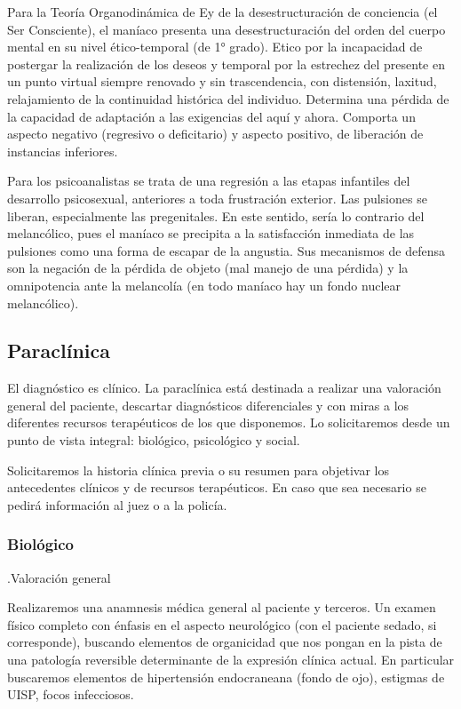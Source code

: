\documentclass{scrbook}
\begin{document}
Para la Teoría Organodinámica de Ey de la desestructuración de conciencia (el Ser Consciente), el maníaco presenta una desestructuración del orden del cuerpo mental en su nivel ético-temporal (de 1° grado). Etico por la incapacidad de postergar la realización de los deseos y temporal por la estrechez del presente en un punto virtual siempre renovado y sin trascendencia, con distensión, laxitud, relajamiento de la continuidad histórica del individuo. Determina una pérdida de la capacidad de adaptación a las exigencias del aquí y ahora. Comporta un aspecto negativo (regresivo o deficitario) y aspecto positivo, de liberación de instancias inferiores.

Para los psicoanalistas se trata de una regresión a las etapas infantiles del desarrollo psicosexual, anteriores a toda frustración exterior. Las pulsiones se liberan, especialmente las pregenitales. En este sentido, sería lo contrario del melancólico, pues el maníaco se precipita a la satisfacción inmediata de las pulsiones como una forma de escapar de la angustia. Sus mecanismos de defensa son la negación de la pérdida de objeto (mal manejo de una pérdida) y la omnipotencia ante la melancolía (en todo maníaco hay un fondo nuclear melancólico).
\subsection*{Paraclínica}
El diagnóstico es clínico. La paraclínica está destinada a realizar una valoración general del paciente, descartar diagnósticos diferenciales y con miras a los diferentes recursos terapéuticos de los que disponemos. Lo solicitaremos desde un punto de vista integral: biológico, psicológico y social.

Solicitaremos la historia clínica previa o su resumen para objetivar los antecedentes clínicos y de recursos terapéuticos. En caso que sea necesario se pedirá información al juez o a la policía.
\subsubsection*{Biológico}
.Valoración general

Realizaremos una anamnesis médica general al paciente y terceros. Un examen físico completo con énfasis en el aspecto neurológico (con el paciente sedado, si corresponde), buscando elementos de organicidad que nos pongan en la pista de una patología reversible determinante de la expresión clínica actual. En particular buscaremos elementos de hipertensión endocraneana (fondo de ojo), estigmas de UISP, focos infecciosos.
\end{document}
